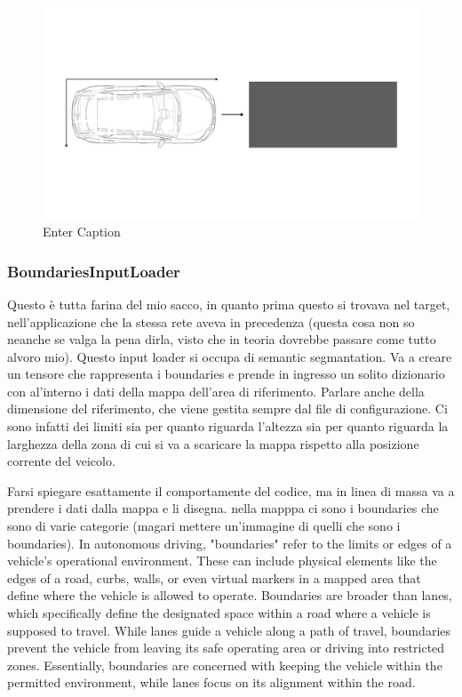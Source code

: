 \begin{figure}
    \centering
    \includegraphics[width=0.75\linewidth]{LateX//figs/egoLoader.pdf}
    \caption{Enter Caption}
    \label{fig:enter-label}
\end{figure}

\subsubsection{BoundariesInputLoader}
Questo è tutta farina del mio sacco, in quanto prima questo si trovava nel target, nell'applicazione che la stessa rete aveva in precedenza (questa cosa non so neanche se valga la pena dirla, visto che in teoria dovrebbe passare come tutto alvoro mio). 
Questo input loader si occupa di semantic segmantation. Va a creare un tensore che rappresenta i boundaries e prende in ingresso un solito dizionario con al'interno i dati della mappa dell'area di riferimento. Parlare anche della dimensione del riferimento, che viene gestita sempre dal file di configurazione. Ci sono infatti dei limiti sia per quanto riguarda l'altezza sia per quanto riguarda la larghezza della zona di cui si va a scaricare la mappa rispetto alla posizione corrente del veicolo. 

Farsi spiegare esattamente il comportamente del codice, ma in linea di massa va a prendere i dati dalla mappa e li disegna. nella mapppa ci sono i boundaries che sono di varie categorie (magari mettere un'immagine di quelli che sono i boundaries). 
In autonomous driving, "boundaries" refer to the limits or edges of a vehicle's operational environment. These can include physical elements like the edges of a road, curbs, walls, or even virtual markers in a mapped area that define where the vehicle is allowed to operate. Boundaries are broader than lanes, which specifically define the designated space within a road where a vehicle is supposed to travel. While lanes guide a vehicle along a path of travel, boundaries prevent the vehicle from leaving its safe operating area or driving into restricted zones. Essentially, boundaries are concerned with keeping the vehicle within the permitted environment, while lanes focus on its alignment within the road.

